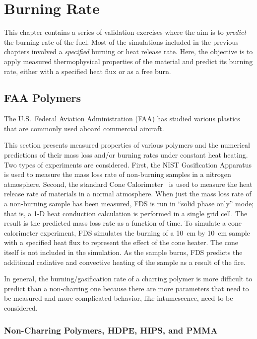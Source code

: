 
\chapter{Burning Rate}

This chapter contains a series of validation exercises where the aim is to {\em predict} the burning rate of the fuel. Most of the simulations included in the previous chapters involved
a {\em specified} burning or heat release rate. Here, the objective is to apply measured thermophysical properties of the material and predict its burning rate, either with a
specified heat flux or as a free burn.



\section{FAA Polymers}

The U.S.~Federal Aviation Administration (FAA) has studied various plastics that are commonly used aboard commercial aircraft.

This section presents measured properties of various polymers and the numerical predictions of their mass loss and/or burning rates under constant heat heating.
Two types of experiments are considered. First, the NIST Gasification Apparatus is used to measure the mass loss rate of non-burning samples in a nitrogen atmosphere.
Second, the standard Cone Calorimeter~\cite{conecal} is used to measure the heat release rate of materials in a normal atmosphere.
When just the mass loss rate of a non-burning sample has been measured, FDS is run in ``solid phase only'' mode; that is, a 1-D heat conduction calculation is performed in a
single grid cell. The result is the predicted mass loss rate as a function of time. To simulate a cone calorimeter experiment, FDS simulates the burning of a 10~cm by 10~cm sample with
a specified heat flux to represent the effect of the cone heater. The cone itself is not included in the simulation. As the sample burns, FDS predicts the additional radiative and
convective heating of the sample as a result of the fire.

In general, the burning/gasification rate of a charring polymer is more difficult to predict than a non-charring one because there are more parameters that need to be measured and
more complicated behavior, like intumescence, need to be considered.


\newpage

\subsection{Non-Charring Polymers, HDPE, HIPS, and PMMA}

